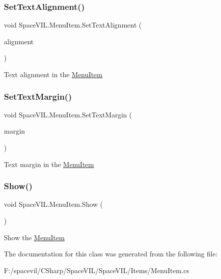 \subsubsection{\texorpdfstring{Set\+Text\+Alignment()}{SetTextAlignment()}}
{\footnotesize\ttfamily void Space\+V\+I\+L.\+Menu\+Item.\+Set\+Text\+Alignment (\begin{DoxyParamCaption}\item[{Item\+Alignment}]{alignment }\end{DoxyParamCaption})}



Text alignment in the \mbox{\hyperlink{class_space_v_i_l_1_1_menu_item}{Menu\+Item}} 

\mbox{\label{class_space_v_i_l_1_1_menu_item_a91be48e8848efeafce18980725031e09}} 
\subsubsection{\texorpdfstring{Set\+Text\+Margin()}{SetTextMargin()}}
{\footnotesize\ttfamily void Space\+V\+I\+L.\+Menu\+Item.\+Set\+Text\+Margin (\begin{DoxyParamCaption}\item[{\mbox{\hyperlink{struct_space_v_i_l_1_1_decorations_1_1_indents}{Indents}}}]{margin }\end{DoxyParamCaption})}



Text margin in the \mbox{\hyperlink{class_space_v_i_l_1_1_menu_item}{Menu\+Item}} 

\mbox{\label{class_space_v_i_l_1_1_menu_item_a6580890d0efc3f2a6f075d7a4ac71b1d}} 
\subsubsection{\texorpdfstring{Show()}{Show()}}
{\footnotesize\ttfamily void Space\+V\+I\+L.\+Menu\+Item.\+Show (\begin{DoxyParamCaption}{ }\end{DoxyParamCaption})}



Show the \mbox{\hyperlink{class_space_v_i_l_1_1_menu_item}{Menu\+Item}} 



The documentation for this class was generated from the following file\+:\begin{DoxyCompactItemize}
\item 
F\+:/spacevil/\+C\+Sharp/\+Space\+V\+I\+L/\+Space\+V\+I\+L/\+Items/Menu\+Item.\+cs\end{DoxyCompactItemize}

